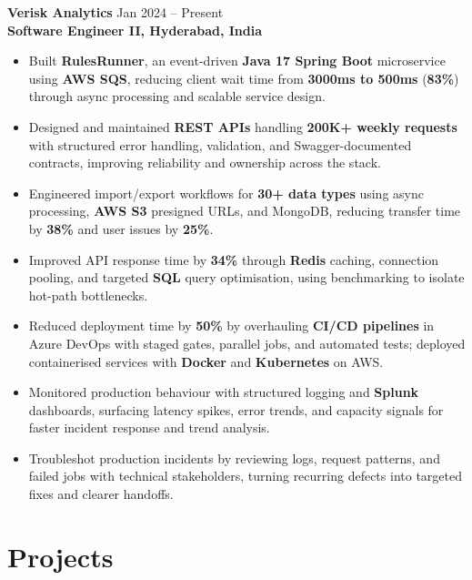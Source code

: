 \documentclass[10pt,letterpaper]{article}
\begin{document}
\textbf{Verisk Analytics} \hfill Jan 2024 -- Present \\
\textbf{Software Engineer II, Hyderabad, India}
\begin{itemize}[leftmargin=*]
    \item Built \textbf{RulesRunner}, an event-driven \textbf{Java 17 Spring Boot} microservice using \textbf{AWS SQS}, reducing client wait time from \textbf{3000ms to 500ms} (\textbf{83\%}) through async processing and scalable service design.
    \item Designed and maintained \textbf{REST APIs} handling \textbf{200K+ weekly requests} with structured error handling, validation, and Swagger-documented contracts, improving reliability and ownership across the stack.
    \item Engineered import/export workflows for \textbf{30+ data types} using async processing, \textbf{AWS S3} presigned URLs, and MongoDB, reducing transfer time by \textbf{38\%} and user issues by \textbf{25\%}.
    \item Improved API response time by \textbf{34\%} through \textbf{Redis} caching, connection pooling, and targeted \textbf{SQL} query optimisation, using benchmarking to isolate hot-path bottlenecks.
    \item Reduced deployment time by \textbf{50\%} by overhauling \textbf{CI/CD pipelines} in Azure DevOps with staged gates, parallel jobs, and automated tests; deployed containerised services with \textbf{Docker} and \textbf{Kubernetes} on AWS.
    \item Monitored production behaviour with structured logging and \textbf{Splunk} dashboards, surfacing latency spikes, error trends, and capacity signals for faster incident response and trend analysis.
    \item Troubleshot production incidents by reviewing logs, request patterns, and failed jobs with technical stakeholders, turning recurring defects into targeted fixes and clearer handoffs.
\end{itemize}

\section*{Projects}
\end{document}
